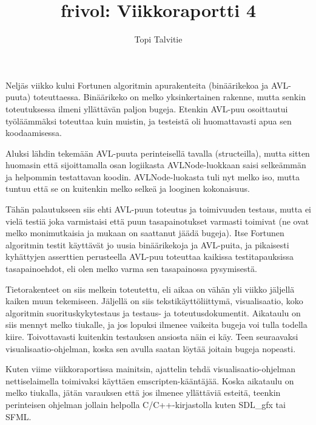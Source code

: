 \documentclass[a4paper, 11pt, finnish]{article}
\author{Topi Talvitie}
\title{frivol: Viikkoraportti 4}
\begin{document}
\maketitle

Neljäs viikko kului Fortunen algoritmin apurakenteita (binäärikekoa ja AVL-puuta) toteuttaessa.  Binäärikeko on melko yksinkertainen rakenne, mutta senkin toteutuksessa ilmeni yllättävän paljon bugeja. Etenkin AVL-puu osoittautui työläämmäksi toteuttaa kuin muistin, ja testeistä oli huomattavasti apua sen koodaamisessa.

Aluksi lähdin tekemään AVL-puuta perinteisellä tavalla (structeilla), mutta sitten huomasin että sijoittamalla osan logiikasta AVLNode-luokkaan saisi selkeämmän ja helpommin testattavan koodin. AVLNode-luokasta tuli nyt melko iso, mutta tuntuu että se on kuitenkin melko selkeä ja looginen kokonaisuus.

Tähän palautukseen siis ehti AVL-puun toteutus ja toimivuuden testaus, mutta ei vielä testiä joka varmistaisi että puun tasapainotukset varmasti toimivat (ne ovat melko monimutkaisia ja mukaan on saattanut jäädä bugeja). Itse Fortunen algoritmin testit käyttävät jo uusia binäärikekoja ja AVL-puita, ja pikaisesti kyhättyjen asserttien perusteella AVL-puu toteuttaa kaikissa testitapauksissa tasapainoehdot, eli olen melko varma sen tasapainossa pysymisestä.

Tietorakenteet on siis melkein toteutettu, eli aikaa on vähän yli viikko jäljellä kaiken muun tekemiseen. Jäljellä on siis tekstikäyttöliittymä, visualisaatio, koko algoritmin suorituskykytestaus ja testaus- ja toteutusdokumentit. Aikataulu on siis mennyt melko tiukalle, ja jos lopuksi ilmenee vaikeita bugeja voi tulla todella kiire. Toivottavasti kuitenkin testauksen ansiosta näin ei käy. Teen seuraavaksi visualisaatio-ohjelman, koska sen avulla saatan löytää joitain bugeja nopeasti.

Kuten viime viikkoraportissa mainitsin, ajattelin tehdä visualisaatio-ohjelman nettiselaimella toimivaksi käyttäen emscripten-kääntäjää. Koska aikataulu on melko tiukalla, jätän varauksen että jos ilmenee yllättäviä esteitä, teenkin perinteisen ohjelman jollain helpolla C/C++-kirjastolla kuten SDL\_gfx tai SFML.
\end{document}
